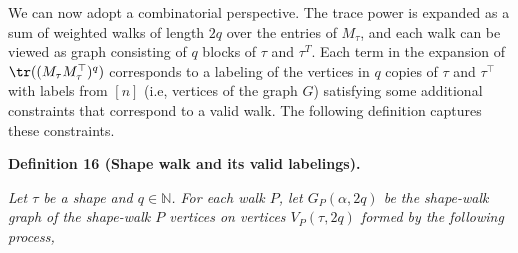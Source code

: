 We can now adopt a combinatorial perspective. The trace power is expanded as a sum of weighted walks of length $2q$ over the entries of $M_{\tau}$, and each walk can be viewed as graph consisting of $q$ blocks of $\tau$ and $\tau^{T}$. Each term in the expansion of $\tr((M_{\tau}M_{\tau}^{\top})^{q})$ corresponds to a labeling of the vertices in $q$ copies of $\tau$ and $\tau^{\top}$ with labels from $[n]$ (i.e, vertices of the graph $G$) satisfying some additional constraints that correspond to a valid walk. The following definition captures these constraints.\par





\par\medskip\noindent\textbf{
\textbf{Definition 16}\textbf{ }(Shape walk and its valid labelings)\textbf{.}
}\par



\emph{Let $\tau$ be a shape and $q\in\mathbb{N}$. For each walk $P$, let $G_{P}(\alpha,2q)$ be the shape-walk graph of the shape-walk $P$ vertices on vertices $V_{P}(\tau,2q)$ formed by the following process,}\par


